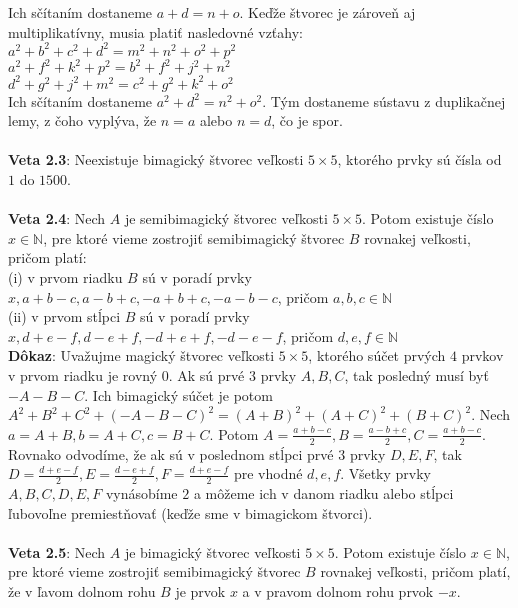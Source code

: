 \documentclass[12pt]{article}
\begin{document}
Ich sčítaním dostaneme $a + d = n + o$. Keďže štvorec je zároveň aj multiplikatívny, musia platiť nasledovné vzťahy: \\
$a^2 + b^2 + c^2 + d^2 = m^2 + n^2 + o^2 + p^2$ \\
$a^2 + f^2 + k^2 + p^2 = b^2 + f^2 + j^2 + n^2$ \\
$d^2 + g^2 + j^2 + m^2 = c^2 + g^2 + k^2 + o^2$ \\

Ich sčítaním dostaneme $a^2 + d^2 = n^2 + o^2$. Tým dostaneme sústavu z duplikačnej lemy, z čoho vyplýva, že $n = a$ alebo $n = d$, čo je spor. \\\\

\textbf{Veta 2.3}: Neexistuje bimagický štvorec veľkosti $5 \times 5$, ktorého prvky sú čísla od $1$ do $1500$. \\\\

\textbf{Veta 2.4}: Nech $A$ je semibimagický štvorec veľkosti $5 \times 5$. Potom existuje číslo $x \in \mathbb{N}$, pre ktoré vieme zostrojiť semibimagický štvorec $B$ rovnakej veľkosti, pričom platí: \\
(i) v prvom riadku $B$ sú v poradí prvky $x, a+b-c, a-b+c, -a+b+c, -a-b-c$, pričom $a,b,c \in \mathbb{N}$ \\   
(ii) v prvom stĺpci $B$ sú v poradí prvky $x, d+e-f, d-e+f, -d+e+f, -d-e-f$, pričom $d,e,f \in \mathbb{N}$ \\

\textbf{Dôkaz}: Uvažujme magický štvorec veľkosti $5 \times 5$, ktorého súčet prvých $4$ prvkov v prvom riadku je rovný $0$. Ak sú prvé $3$ prvky $A, B, C$, tak posledný musí byť $-A-B-C$. Ich bimagický súčet je potom $A^2 + B^2 + C^2 + (-A-B-C)^2 = (A+B)^2 + (A+C)^2 + (B+C)^2$. Nech $a = A+B, b = A+C, c = B+C$. Potom $A = \frac{a+b-c}{2}, B = \frac{a-b+c}{2}, C = \frac{a+b-c}{2}$. Rovnako odvodíme, že ak sú v poslednom stĺpci prvé $3$ prvky $D, E, F$, tak $D = \frac{d+e-f}{2}, E = \frac{d-e+f}{2}, F = \frac{d+e-f}{2}$ pre vhodné $d,e,f$. Všetky prvky $A, B, C, D, E, F$ vynásobíme $2$ a môžeme ich v danom riadku alebo stĺpci ľubovoľne premiestňovať (keďže sme v bimagickom štvorci). \\\\

\textbf{Veta 2.5}: Nech $A$ je bimagický štvorec veľkosti $5 \times 5$. Potom existuje číslo $x \in \mathbb{N}$, pre ktoré vieme zostrojiť semibimagický štvorec $B$ rovnakej veľkosti, pričom platí, že v ľavom dolnom rohu $B$ je prvok $x$ a v pravom dolnom rohu prvok $-x$. \\\\
\end{document}
